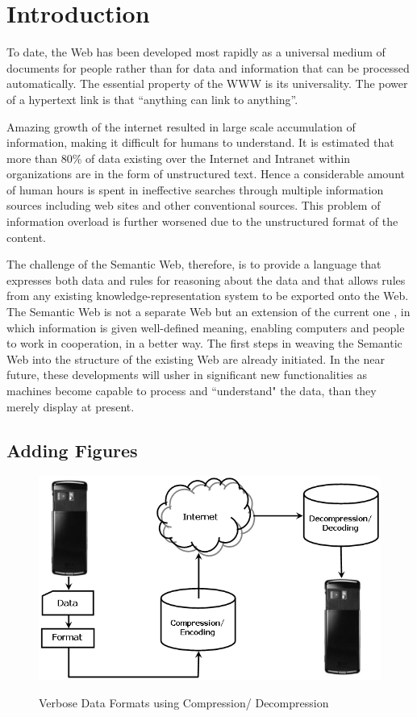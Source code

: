 \chapter{Introduction}
\label{intro}

To date, the Web has been developed most rapidly as a universal medium of documents 
for people rather than for data and information that can be processed 
automatically. The essential property of the WWW is its universality. 
The power of a hypertext link is that ``anything can link to anything''.   

Amazing growth of the internet resulted in large scale accumulation of information, 
making it difficult for humans to understand. It is estimated that more than 
80\% of data existing over the Internet and Intranet within organizations are in the 
form of unstructured text. Hence a considerable amount of human hours is spent 
in ineffective searches through multiple information sources including web sites 
and other conventional sources. This problem of information overload is further 
worsened due to the unstructured format of the content.

The challenge of the Semantic Web, therefore, is to provide a language that expresses both data and rules for reasoning about the data and that allows rules from any existing 
knowledge-representation system to be exported onto the Web. The Semantic Web is 
not a separate Web but an extension of the current one \cite{SP01}, in which information is 
given well-defined meaning, enabling computers and people to work in 
cooperation, in a better way. The first steps in weaving the Semantic Web into 
the structure of the existing Web are already initiated. In the near future, 
these developments will usher in significant new functionalities as machines 
become capable to process and ``understand" the data, than they merely 
display at present.

\section{Adding Figures}

\begin{figure}
\begin{center}
\scalebox{0.70}
{\includegraphics{illus2.png}}
\caption{Verbose Data Formats using Compression/ Decompression}  \label{illus}
\end{center}
\end{figure}

